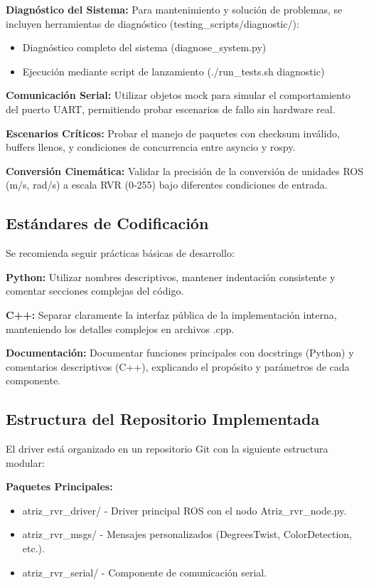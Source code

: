 \documentclass[11pt]{article}
\newcommand{\code}[1]{\textcolor{codeblue}{\url{#1}}}
\numberwithin{figure}{section}
\numberwithin{table}{section}
\def\code#1{#1}%
\begin{document}
\textbf{Diagnóstico del Sistema:} Para mantenimiento y solución de problemas, se incluyen herramientas de diagnóstico (\code{testing\_scripts/diagnostic/}):
\begin{itemize}
    \item Diagnóstico completo del sistema (\code{diagnose\_system.py})
    \item Ejecución mediante script de lanzamiento (\code{./run\_tests.sh diagnostic})
\end{itemize}

\textbf{Comunicación Serial:} Utilizar objetos mock para simular el comportamiento del puerto UART, permitiendo probar escenarios de fallo sin hardware real.

\textbf{Escenarios Críticos:} Probar el manejo de paquetes con checksum inválido, buffers llenos, y condiciones de concurrencia entre asyncio y rospy.

\textbf{Conversión Cinemática:} Validar la precisión de la conversión de unidades ROS (m/s, rad/s) a escala RVR (0-255) bajo diferentes condiciones de entrada.


\subsection{Estándares de Codificación}

Se recomienda seguir prácticas básicas de desarrollo:

\textbf{Python:} Utilizar nombres descriptivos, mantener indentación consistente y comentar secciones complejas del código.

\textbf{C++:} Separar claramente la interfaz pública de la implementación interna, manteniendo los detalles complejos en archivos .cpp.

\textbf{Documentación:} Documentar funciones principales con docstrings (Python) y comentarios descriptivos (C++), explicando el propósito y parámetros de cada componente.


\subsection{Estructura del Repositorio Implementada}

El driver está organizado en un repositorio Git con la siguiente estructura modular:

\textbf{Paquetes Principales:}
\begin{itemize}
    \item \code{atriz\_rvr\_driver/} - Driver principal ROS con el nodo \code{Atriz\_rvr\_node.py}.
    \item \code{atriz\_rvr\_msgs/} - Mensajes personalizados (DegreesTwist, ColorDetection, etc.).
    \item \code{atriz\_rvr\_serial/} - Componente de comunicación serial.
\end{itemize}
\end{document}
